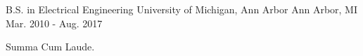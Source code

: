 

\begin{cventries}

  \cventry
    {B.S. in Electrical Engineering} %
    {University of Michigan, Ann Arbor} %
    {Ann Arbor, MI} %
    {Mar. 2010 - Aug. 2017} %
    {
      \begin{cvitems} %
        \item {Summa Cum Laude.}
      \end{cvitems}
    }

\end{cventries}
